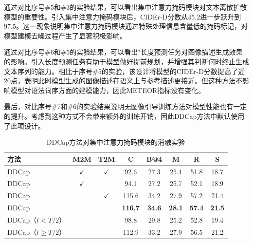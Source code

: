 通过对比序号\#5和\#3的实验结果，可以看出集中注意力掩码模块对文本离散扩散模型的重要性。引入集中注意力掩码模块后，CIDEr-D分数从45.2进一步跃升到97.5。这一现象说明集中注意力掩码模块通过特殊处理信息含量低的掩码标记，对模型建模去噪过程产生了显著积极影响。%

通过对比序号\#6和\#5的实验结果，可以看出"长度预测任务对图像描述生成效果的影响。引入长度预测任务有助于模型做好提前规划，并增强其判断何时终止生成文本序列的能力。相比于序号\#5的实验，该设计将模型的CIDEr-D分数提高了近20点，表明此时模型生成的图像描述在语义上与参考描述更接近。但这种方法不影响模型对语法词序方面的建模能力，因此METEOR指标没有变化。

最后，对比序号\#7和\#6的实验结果说明无图像引导训练方法对模型性能也有一定的提升。考虑到这种方式不会带来额外的训练开销，因此DDCap方法中默认使用了此项设计。


\begin{table}
  \centering
  \caption{DDCap方法对集中注意力掩码模块的消融实验}
  \begin{tabular}{lccccccc}
    \toprule
    方法  & M2M & T2M & C & B@4 & M & R & S\\
    \midrule
    DDCap &$\checkmark$&$\checkmark$& 92.6 & 27.3  & 25.4 & 51.8 & 18.7  \\ 
    DDCap &$\checkmark$&& 94.1 & 27.2  & 25.7 & 52.1 & 18.9  \\ 
    DDCap  & &$\checkmark$& 115.6 & 34.2  & 27.9 & 57.2 & 21.4  \\
    DDCap  && & \textbf{116.7} & \textbf{34.6}  & \textbf{28.1} & \textbf{57.4} & \textbf{21.5}\\
     \midrule
    DDCap（$t < T/2$） &&& 98.8 & 29.8  & 25.2 & 52.8 & 19.4\\
    DDCap（$t\geq T/2$）  &&& 112.9 & 33.2  & 27.9 & 56.5 & 21.2\\
    \bottomrule
  \end{tabular}
  \label{tab:ddcap-maskatten}
\end{table}

